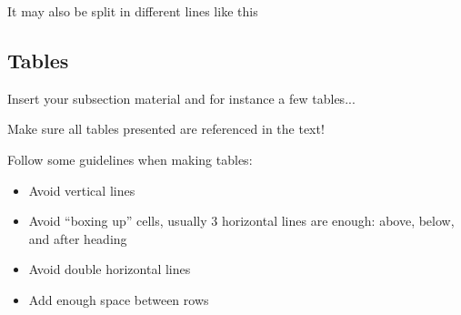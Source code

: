 It may also be split in different lines like this
\iffalse
\begin{eqnarray}
  {\rm Minimize}   && Y({\bf \alpha},{\bf q}({\bf \alpha}))            \nonumber           \\
  {\rm w.r.t.}     && {\bf \alpha} \,,                                 \label{eq:minimize} \\
  {\rm subject~to} && {\cal R}({\bf \alpha},{\bf q}({\bf \alpha})) = 0 \nonumber           \\
                   &&       C ({\bf \alpha},{\bf q}({\bf \alpha})) = 0 \,. \nonumber
\end{eqnarray}

It is also possible to use subequations. Equations~\ref{eq:continuity}, \ref{eq:momentum} and \ref{eq:energy} form the Naver--Stokes equations~\ref{eq:NavierStokes}.

\begin{subequations}
    \begin{equation}
    \frac{\partial \rho}{\partial t} + \frac{\partial}{\partial x_j}\left( \rho u_j \right) = 0 \,,
    \label{eq:continuity}
    \end{equation}
    \begin{equation}
    \frac{\partial}{\partial t}\left( \rho u_i \right) + \frac{\partial}{\partial x_j} \left( \rho u_i u_j + p \delta_{ij} - \tau_{ji} \right) = 0, \quad i=1,2,3 \,,
    \label{eq:momentum}
    \end{equation}
    \begin{equation}
        \frac{\partial}{\partial t}\left( \rho E \right) + \frac{\partial}{\partial x_j} \left( \rho E u_j + p u_j - u_i \tau_{ij} + q_j \right) = 0 \,.
    \label{eq:energy}
    \end{equation}
\label{eq:NavierStokes}%
\end{subequations}
\fi

\subsection{Tables}
\label{section:tables}

Insert your subsection material and for instance a few tables...

Make sure all tables presented are referenced in the text!

Follow some guidelines when making tables:
\iffalse
\begin{itemize}
  \item Avoid vertical lines
  \item Avoid “boxing up” cells, usually 3 horizontal lines are enough: above, below, and after heading
  \item Avoid double horizontal lines
  \item Add enough space between rows
\end{itemize}

